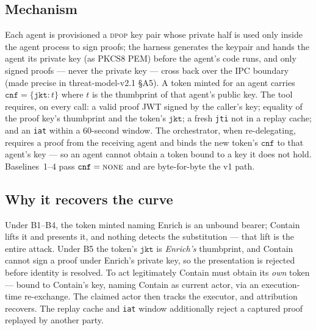 \documentclass[11pt]{article}
\newcommand{\code}[1]{\texttt{#1}}
\newcommand{\cnf}{\code{cnf}}
\newcommand{\jkt}{\code{jkt}}
\newcommand{\dpop}{\textsc{dpop}}
\begin{document}
\subsection{Mechanism}
Each agent is provisioned a \dpop{} key pair whose private half is used only
inside the agent process to sign proofs; the harness generates the keypair and
hands the agent its private key (as PKCS8 PEM) before the agent's code runs,
and only signed proofs --- never the private key --- cross back over the IPC
boundary (made precise in threat-model-v2.1 \S A5). A token minted for an agent
carries $\cnf=\{\jkt:t\}$ where
$t$ is the thumbprint of that agent's public key. The tool requires, on
every call: a valid proof JWT signed by the caller's key; equality of the
proof key's thumbprint and the token's $\jkt$; a fresh \code{jti} not in a
replay cache; and an \code{iat} within a 60-second window. The orchestrator,
when re-delegating, requires a proof from the receiving agent and binds the
new token's $\cnf$ to that agent's key --- so an agent cannot obtain a token
bound to a key it does not hold. Baselines~1--4 pass $\cnf=\textsc{none}$ and
are byte-for-byte the v1 path.

\subsection{Why it recovers the curve}
Under B1--B4, the token minted naming Enrich is an unbound bearer; Contain
lifts it and presents it, and nothing detects the substitution --- that lift
is the entire attack. Under B5 the token's $\jkt$ is \emph{Enrich's}
thumbprint, and Contain cannot sign a proof under Enrich's private key, so
the presentation is rejected before identity is resolved. To act legitimately
Contain must obtain its \emph{own} token --- bound to Contain's key, naming
Contain as current actor, via an execution-time re-exchange. The claimed
actor then tracks the executor, and attribution recovers. The replay cache
and \code{iat} window additionally reject a captured proof replayed by
another party.
\end{document}

